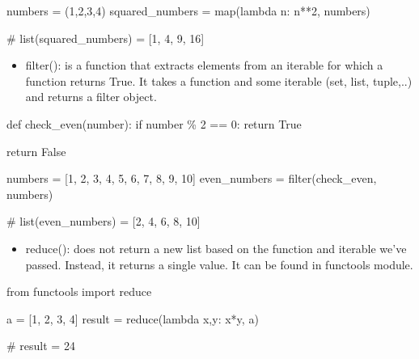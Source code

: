 \documentclass[
  letterpaper,
  DIV=11,
  numbers=noendperiod]{scrreprt}
\newenvironment{Shaded}{\begin{snugshade}}{\end{snugshade}}
\newcommand{\BuiltInTok}[1]{\textcolor[rgb]{0.00,0.23,0.31}{#1}}
\newcommand{\CommentTok}[1]{\textcolor[rgb]{0.37,0.37,0.37}{#1}}
\newcommand{\ControlFlowTok}[1]{\textcolor[rgb]{0.00,0.23,0.31}{#1}}
\newcommand{\DecValTok}[1]{\textcolor[rgb]{0.68,0.00,0.00}{#1}}
\newcommand{\ImportTok}[1]{\textcolor[rgb]{0.00,0.46,0.62}{#1}}
\newcommand{\KeywordTok}[1]{\textcolor[rgb]{0.00,0.23,0.31}{#1}}
\newcommand{\NormalTok}[1]{\textcolor[rgb]{0.00,0.23,0.31}{#1}}
\newcommand{\OperatorTok}[1]{\textcolor[rgb]{0.37,0.37,0.37}{#1}}
\newcommand{\VariableTok}[1]{\textcolor[rgb]{0.07,0.07,0.07}{#1}}
\providecommand{\tightlist}{%
  \setlength{\itemsep}{0pt}\setlength{\parskip}{0pt}}\usepackage{longtable,booktabs,array}
\begin{document}
\begin{Shaded}
\begin{Highlighting}[]
\NormalTok{numbers }\OperatorTok{=}\NormalTok{ (}\DecValTok{1}\NormalTok{,}\DecValTok{2}\NormalTok{,}\DecValTok{3}\NormalTok{,}\DecValTok{4}\NormalTok{)}
\NormalTok{squared\_numbers }\OperatorTok{=} \BuiltInTok{map}\NormalTok{(}\KeywordTok{lambda}\NormalTok{ n: n}\OperatorTok{**}\DecValTok{2}\NormalTok{, numbers)}

\CommentTok{\# list(squared\_numbers) = [1, 4, 9, 16]}
\end{Highlighting}
\end{Shaded}

\begin{itemize}
\tightlist
\item
  filter(): is a function that extracts elements from an iterable for
  which a function returns True. It takes a function and some iterable
  (set, list, tuple,..) and returns a filter object.
\end{itemize}

\begin{Shaded}
\begin{Highlighting}[]
\KeywordTok{def}\NormalTok{ check\_even(number):}
    \ControlFlowTok{if}\NormalTok{ number }\OperatorTok{\%} \DecValTok{2} \OperatorTok{==} \DecValTok{0}\NormalTok{:}
        \ControlFlowTok{return} \VariableTok{True}  

    \ControlFlowTok{return} \VariableTok{False}

\NormalTok{numbers }\OperatorTok{=}\NormalTok{ [}\DecValTok{1}\NormalTok{, }\DecValTok{2}\NormalTok{, }\DecValTok{3}\NormalTok{, }\DecValTok{4}\NormalTok{, }\DecValTok{5}\NormalTok{, }\DecValTok{6}\NormalTok{, }\DecValTok{7}\NormalTok{, }\DecValTok{8}\NormalTok{, }\DecValTok{9}\NormalTok{, }\DecValTok{10}\NormalTok{]}
\NormalTok{even\_numbers }\OperatorTok{=} \BuiltInTok{filter}\NormalTok{(check\_even, numbers)}

\CommentTok{\# list(even\_numbers) = [2, 4, 6, 8, 10]}
\end{Highlighting}
\end{Shaded}

\begin{itemize}
\tightlist
\item
  reduce(): does not return a new list based on the function and
  iterable we've passed. Instead, it returns a single value. It can be
  found in functools module.
\end{itemize}

\begin{Shaded}
\begin{Highlighting}[]
\ImportTok{from}\NormalTok{ functools }\ImportTok{import} \BuiltInTok{reduce}

\NormalTok{a }\OperatorTok{=}\NormalTok{ [}\DecValTok{1}\NormalTok{, }\DecValTok{2}\NormalTok{, }\DecValTok{3}\NormalTok{, }\DecValTok{4}\NormalTok{]}
\NormalTok{result }\OperatorTok{=} \BuiltInTok{reduce}\NormalTok{(}\KeywordTok{lambda}\NormalTok{ x,y: x}\OperatorTok{*}\NormalTok{y, a)}

\CommentTok{\# result = 24}
\end{Highlighting}
\end{Shaded}
\end{document}
